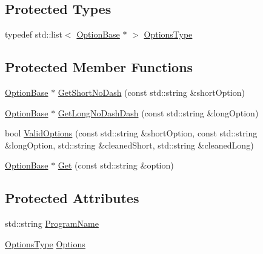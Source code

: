 \subsection*{Protected Types}
\begin{DoxyCompactItemize}
\item 
typedef std\-::list$<$ \hyperlink{classcmn_command_line_options_1_1_option_base}{Option\-Base} $\ast$ $>$ \hyperlink{classcmn_command_line_options_a421232856a8c450024b205ed8a4c4c7d}{Options\-Type}
\end{DoxyCompactItemize}
\subsection*{Protected Member Functions}
\begin{DoxyCompactItemize}
\item 
\hyperlink{classcmn_command_line_options_1_1_option_base}{Option\-Base} $\ast$ \hyperlink{classcmn_command_line_options_a9654862a446aff3bdfeef119ff9447f5}{Get\-Short\-No\-Dash} (const std\-::string \&short\-Option)
\item 
\hyperlink{classcmn_command_line_options_1_1_option_base}{Option\-Base} $\ast$ \hyperlink{classcmn_command_line_options_ae31b7a96cd760eacaa1f0f32e158573d}{Get\-Long\-No\-Dash\-Dash} (const std\-::string \&long\-Option)
\item 
bool \hyperlink{classcmn_command_line_options_ad19b7c1fa18e247d5444595526a228a8}{Valid\-Options} (const std\-::string \&short\-Option, const std\-::string \&long\-Option, std\-::string \&cleaned\-Short, std\-::string \&cleaned\-Long)
\item 
\hyperlink{classcmn_command_line_options_1_1_option_base}{Option\-Base} $\ast$ \hyperlink{classcmn_command_line_options_a5cb0df17d19e8de595bd9a5c1b9afb38}{Get} (const std\-::string \&option)
\end{DoxyCompactItemize}
\subsection*{Protected Attributes}
\begin{DoxyCompactItemize}
\item 
std\-::string \hyperlink{classcmn_command_line_options_a3bd5b3dce4d3b8b3f9010d387513f8cb}{Program\-Name}
\item 
\hyperlink{classcmn_command_line_options_a421232856a8c450024b205ed8a4c4c7d}{Options\-Type} \hyperlink{classcmn_command_line_options_a921f64221c35be2f04cb23d5d2a2952f}{Options}
\end{DoxyCompactItemize}


